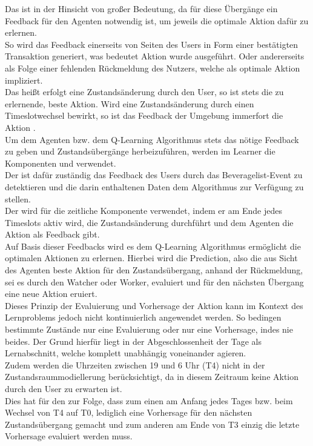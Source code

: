 Das ist in der Hinsicht von großer Bedeutung, da für diese Übergänge ein Feedback für den Agenten notwendig ist, um jeweils die optimale Aktion dafür zu erlernen. \\
So wird das Feedback einerseits von Seiten des Users in Form einer bestätigten Transaktion generiert, was bedeutet Aktion  wurde ausgeführt. Oder andererseits als Folge einer fehlenden Rückmeldung des Nutzers, welche  als optimale Aktion impliziert. \\
Das heißt erfolgt eine Zustandsänderung durch den User, so ist stets  die zu erlernende, beste Aktion. Wird eine Zustandsänderung durch einen Timeslotwechsel bewirkt, so ist das Feedback der Umgebung immerfort die Aktion . \\
Um dem Agenten bzw. dem Q-Learning Algorithmus stets das nötige Feedback zu geben und Zustandsübergänge herbeizuführen, werden im Learner die Komponenten  und  verwendet. \\
Der  ist dafür zuständig das Feedback des Users durch das Beveragelist-Event zu detektieren und die darin enthaltenen Daten dem Algorithmus zur Verfügung zu stellen. \\
Der  wird für die zeitliche Komponente verwendet, indem er am Ende jedes Timeslots aktiv wird, die Zustandsänderung durchführt und dem Agenten die Aktion  als Feedback gibt. \\
Auf Basis dieser Feedbacks wird es dem Q-Learning Algorithmus ermöglicht die optimalen Aktionen zu erlernen. Hierbei wird die Prediction, also die aus Sicht des Agenten beste Aktion für den Zustandsübergang, anhand der Rückmeldung, sei es durch den Watcher oder Worker, evaluiert und für den nächsten Übergang eine neue Aktion eruiert. \\
Dieses Prinzip der Evaluierung und Vorhersage der Aktion kann im Kontext des Lernproblems jedoch nicht kontinuierlich angewendet werden. 
So bedingen bestimmte Zustände nur eine Evaluierung oder nur eine Vorhersage, indes nie beides. Der Grund hierfür liegt in der Abgeschlossenheit der Tage als Lernabschnitt, welche komplett unabhängig voneinander agieren. \\
Zudem werden die Uhrzeiten zwischen 19 und 6 Uhr (T4) nicht in der Zustandsraummodiellerung berücksichtigt, da in diesem Zeitraum keine Aktion durch den User zu erwarten ist.\\ 
Dies hat für den  zur Folge, dass zum einen am Anfang jedes Tages bzw. beim Wechsel von T4 auf T0, lediglich eine Vorhersage für den nächsten Zustandsübergang gemacht und zum anderen am Ende von T3 einzig die letzte Vorhersage evaluiert werden muss.\\\\

